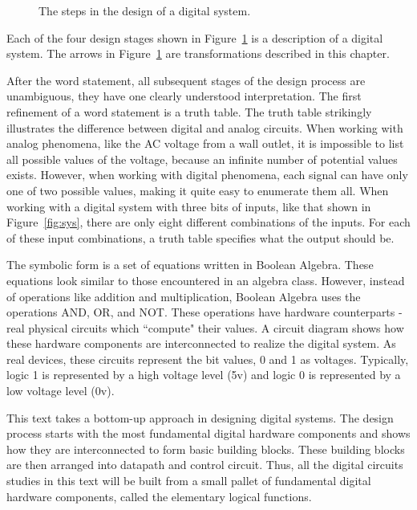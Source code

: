 \begin{figure}[ht]
\caption{The steps in the design of a digital system.}
\label{fig:Design}
\end{figure}

Each of the four design stages shown in Figure~\ref{fig:Design} 
is a description of a digital system.  The arrows in 
Figure~\ref{fig:Design} are 
transformations described in this chapter.  

After the word statement, all subsequent stages of the design process
are unambiguous, they have one clearly understood interpretation.  The first
refinement of a word statement is a truth table.  The truth table strikingly 
illustrates the difference between digital and analog circuits.  When
working with analog phenomena, like the AC voltage from a wall outlet,
it is impossible to list all possible values of the voltage, because 
an infinite number of potential values exists.  However, when working
with digital phenomena, each signal can have only one of two possible values,
making it quite easy to enumerate them all.  When working with a
digital system with three bits of inputs, like that shown in 
Figure~\ref{fig:sys}, there are only eight
different combinations of the inputs.  For each of these input 
combinations, a truth table specifies what the output should be.  

The symbolic form is a set of equations written in Boolean Algebra.
These equations look similar to those encountered
in an algebra class. However, instead of operations like addition 
and multiplication, Boolean Algebra uses the operations AND, OR, and 
NOT.  These operations have hardware counterparts - real physical 
circuits which ``compute" their values.  A circuit diagram shows how
these hardware components are interconnected to realize the 
digital system.  As real devices, these circuits represent the bit 
values, 0 and 1 as voltages.  Typically, logic 1 is represented by 
a high voltage level (5v) and logic 0 is represented by a low 
voltage level (0v). 

This text takes a bottom-up approach in designing digital systems.  
The design process starts with the most fundamental digital hardware 
components and shows how they are interconnected to form basic building 
blocks.  These building blocks are then arranged into datapath and 
control circuit.  Thus, all the digital circuits studies in this text
will be built from a small pallet of fundamental digital hardware 
components, called the elementary logical functions.

